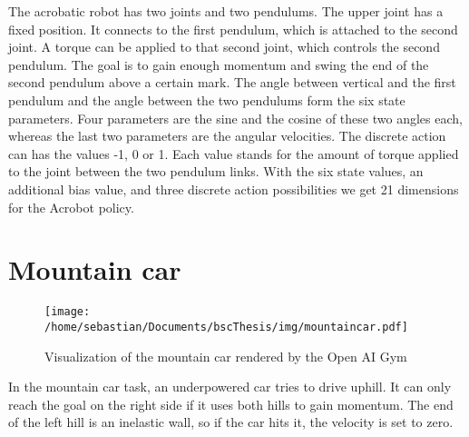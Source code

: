 The acrobatic robot has two joints and two pendulums. The upper joint has a fixed position. It connects to the first pendulum, which is attached to the second joint. A torque can be applied to that second joint, which controls the second pendulum. The goal is to gain enough momentum and swing the end of the second pendulum above a certain mark. The angle between vertical and the first pendulum and the angle between the two pendulums form the six state parameters. Four parameters are the sine and the cosine of these two angles each, whereas the last two parameters are the angular velocities. The discrete action can has the values -1, 0 or 1. Each value stands for the amount of torque applied to the joint between the two pendulum links. With the six state values, an additional bias value, and three discrete action possibilities we get 21 dimensions for the Acrobot policy.

\section{Mountain car}

\begin{wrapfigure}{R}{0.4\textwidth}
    \centering
    \texttt{[image: /home/sebastian/Documents/bscThesis/img/mountaincar.pdf]}
    \caption{Visualization of the mountain car rendered by the Open AI Gym\label{fig:mountaincarPygym}}
\end{wrapfigure}

In the mountain car task, an underpowered car tries to drive uphill. It can only reach the goal on the right side if it uses both hills to gain momentum. The end of the left hill is an inelastic wall, so if the car hits it, the velocity is set to zero.

%
%
